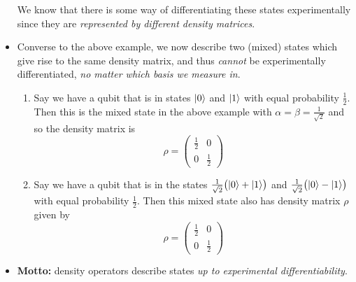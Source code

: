 \documentclass[10pt]{article}
\DeclarePairedDelimiter\ket{\lvert}{\rangle}
\begin{document}
\begin{itemize}
                    We know that there is some way of differentiating these states experimentally since they are \emph{represented by different density matrices}.
                \item Converse to the above example, we now describe two (mixed) states which give rise to the same density matrix, and thus \emph{cannot} be experimentally differentiated, \emph{no matter which basis we measure in}.
                    \begin{enumerate}
                        \item Say we have a qubit that is in states $\ket{0}$ and $\ket{1}$ with equal probability $\frac12$.
                            Then this is the mixed state in the above example with $\alpha=\beta=\frac1{\sqrt2}$ and so the density matrix is
                            \begin{equation*}
                                \rho=\left(
                                \begin{array}{cc}
                                    \frac12 & 0\\
                                    0 & \frac12
                                \end{array}
                                \right)
                            \end{equation*}
                        \item Say we have a qubit that is in the states $\frac1{\sqrt2}\big(\ket{0}+\ket1\big)$ and $\frac1{\sqrt2}\big(\ket0-\ket1\big)$ with equal probability $\frac12$.
                            Then this mixed state also has density matrix $\rho$ given by
                            \begin{equation*}
                                \rho=\left(
                                \begin{array}{cc}
                                    \frac12 & 0\\
                                    0 & \frac12
                                \end{array}
                                \right)
                            \end{equation*}
                    \end{enumerate}
                \item \textbf{Motto:} density operators describe states \emph{up to experimental differentiability}.
            \end{itemize}
\end{document}
